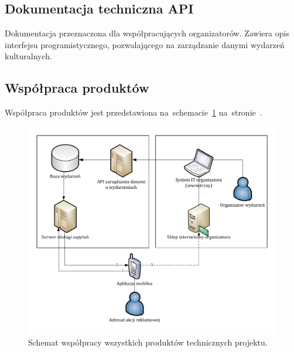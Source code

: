 \subsection{Dokumentacja techniczna API}
Dokumentacja przeznaczona dla współpracujących organizatorów. Zawiera opis
interfejsu programistycznego, pozwalającego na zarządzanie danymi wydarzeń
kulturalnych.

\subsection{Współpraca produktów}
Współpraca produktów jest przedstawiona
na~schemacie~\ref{fig:produkty:schemat_wspolpracy}
na~stronie~\pageref{fig:produkty:schemat_wspolpracy}.
\begin{figure}[p]
    \includegraphics[width=\textwidth]{./figury/produkty/schemat-wspolpracy}
    \caption{Schemat współpracy wszystkich produktów technicznych projektu.}
    \label{fig:produkty:schemat_wspolpracy}
\end{figure}
